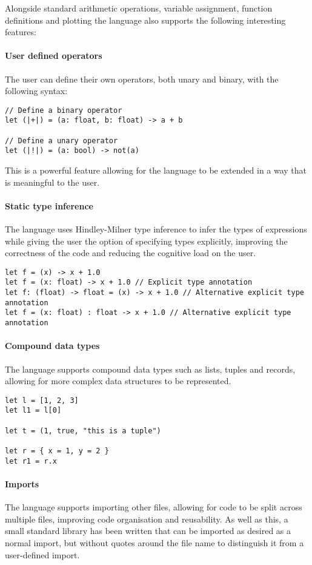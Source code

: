 Alongside standard arithmetic operations, variable assignment, function definitions and plotting the language also 
supports the following interesting features:

\paragraph{User defined operators} The user can define their own operators, both unary and binary, with the 
following syntax:

\begin{verbatim}
// Define a binary operator
let (|+|) = (a: float, b: float) -> a + b

// Define a unary operator
let (|!|) = (a: bool) -> not(a)
\end{verbatim}

This is a powerful feature allowing for the language to be extended in a way that is meaningful to the user.

\paragraph{Static type inference} The language uses Hindley-Milner type inference to infer the types of
expressions while giving the user the option of specifying types explicitly, improving the correctness of the
code and reducing the cognitive load on the user.

\begin{verbatim}
let f = (x) -> x + 1.0
let f = (x: float) -> x + 1.0 // Explicit type annotation
let f: (float) -> float = (x) -> x + 1.0 // Alternative explicit type annotation
let f = (x: float) : float -> x + 1.0 // Alternative explicit type annotation
\end{verbatim}

\paragraph{Compound data types} The language supports compound data types such as lists, tuples and records,
allowing for more complex data structures to be represented.

\begin{verbatim}
let l = [1, 2, 3]
let l1 = l[0]

let t = (1, true, "this is a tuple")

let r = { x = 1, y = 2 }
let r1 = r.x
\end{verbatim}

\paragraph{Imports} The language supports importing other files, allowing for code to be split across multiple
files, improving code organisation and reusability.
As well as this, a small standard library has been written that can be imported as desired as a normal import, but 
without quotes around the file name to distinguish it from a user-defined import.

